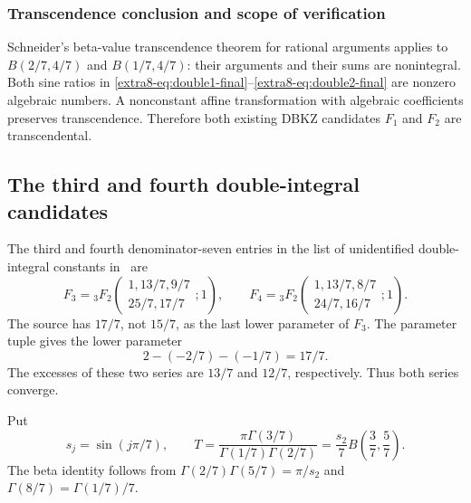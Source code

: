 \documentclass[11pt,a4paper]{article}
\theoremstyle{definition}
\theoremstyle{remark}
\numberwithin{equation}{section}
\begin{document}
\subsubsection{Transcendence conclusion and scope of verification}

Schneider's beta-value transcendence theorem for rational arguments
\cite{extra8-schneider,extra8-waldschmidt} applies to
$B(2/7,4/7)$ and $B(1/7,4/7)$: their arguments and their sums are
nonintegral.  Both sine ratios in
\eqref{extra8-eq:double1-final}--\eqref{extra8-eq:double2-final} are nonzero algebraic
numbers.  A nonconstant affine transformation with algebraic
coefficients preserves transcendence.  Therefore both existing DBKZ
candidates $F_1$ and $F_2$ are transcendental.

\subsection{The third and fourth double-integral candidates}
\label{extra8-sec:double34}

The third and fourth denominator-seven entries in the list of
unidentified double-integral constants in~\cite[p.~14]{extra8-dbkz} are
\[
 F_3={}_3F_2\left(\begin{matrix}1,13/7,9/7\\25/7,17/7\end{matrix};1\right),
 \qquad
 F_4={}_3F_2\left(\begin{matrix}1,13/7,8/7\\24/7,16/7\end{matrix};1\right).
\]
The source has $17/7$, not $15/7$, as the last lower parameter of $F_3$.
The parameter tuple gives the lower parameter
\[2-(-2/7)-(-1/7)=17/7.\]
The excesses of these two series are $13/7$
and $12/7$, respectively.  Thus both series converge.

Put
\[
 s_j=\sin(j\pi/7),\qquad
 T=\frac{\pi\Gamma(3/7)}{\Gamma(1/7)\Gamma(2/7)}
   =\frac{s_2}{7}B\left(\frac37,\frac57\right).
\]
The beta identity follows from
$\Gamma(2/7)\Gamma(5/7)=\pi/s_2$ and
$\Gamma(8/7)=\Gamma(1/7)/7$.
\end{document}
